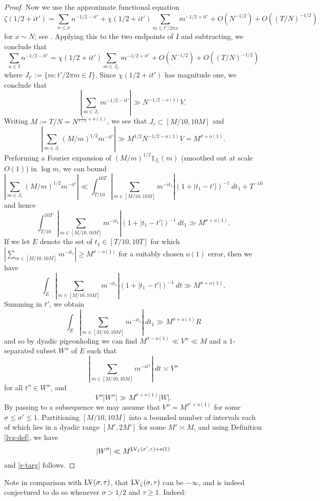 \begin{proof}
    Now we use the approximate functional equation
    $$ \zeta(1/2+it') = \sum_{n \leq x} n^{-1/2-it'} + \chi(1/2+it') \sum_{m \leq t' / 2\pi x} m^{-1/2+it'} + O(N^{-1/2}) + O((T/N)^{-1/2})$$
    for $x \sim N$; see \cite[Theorem 4.1]{ivic}.  Applying this to the two endpoints of $I$ and subtracting, we conclude that
    $$ \sum_{n \in I} n^{-1/2-it'} =\chi(1/2+it') \sum_{m \in J_{t'}} m^{-1/2+it'} + O(N^{-1/2}) + O((T/N)^{-1/2})$$
    where $J_{t'} := \{ m: t' / 2\pi m \in I \}$. Since $\chi(1/2+it')$ has magnitude one, we conclude that
    $$ |\sum_{m \in J_r} m^{-1/2-it'}| \gg N^{-1/2-o(1)} V.$$
    Writing $M := T/N = N^{\frac{1}{\tau-1}+o(1)}$, we see that $J_r \subset [M/10, 10M]$ and
    $$ |\sum_{m \in J_r} (M/m)^{1/2} m^{-it'}| \gg M^{1/2} N^{-1/2-o(1)} V = M^{\sigma+o(1)}.$$
    Performing a Fourier expansion of $(M/m)^{1/2} 1_{J_r}(m)$ (smoothed out at scale $O(1)$) in $\log m$, we can bound
    $$ |\sum_{m \in J_r} (M/m)^{1/2} m^{-it'}| \ll \int_{T/10}^{10T} |\sum_{m \in [M/10,10M]} m^{-it_1}| (1 + |t_1-t'|)^{-1}\ dt_1 + T^{-10}$$
    and hence
    $$ \int_{T/10}^{10T} |\sum_{m \in [M/10,10M]} m^{-it_1}| (1 + |t_1-t'|)^{-1}\ dt_1  \gg M^{\sigma+o(1)}.$$
    If we let $E$ denote the set of $t_1 \in [T/10, 10T]$ for which $|\sum_{m \in [M/10,10M]} m^{-it_1}| \geq M^{\sigma-o(1)}$ for a suitably chosen $o(1)$ error, then we have
    $$ \int_E |\sum_{m \in [M/10,10M]} m^{-it_1}| (1 + |t_1-t'|)^{-1}\ dt  \gg M^{\sigma+o(1)}.$$
    Summing in $t'$, we obtain
    $$ \int_E |\sum_{m \in [M/10,10M]} m^{-it_1}|\ dt_1  \gg M^{\sigma+o(1)} R$$
    and so by dyadic pigeonholing we can find $M^{\sigma-o(1)} \ll V'' \ll M$ and a $1$-separated subset $W''$ of $E$ such that
    $$ |\sum_{m \in [M/10,10M]} m^{-it''}|\ dt \asymp V''$$
    for all $t'' \in W''$, and
    $$ V'' |W''| \gg M^{\sigma+o(1)} |W|.$$
    By passing to a subsequence we may assume that $V'' = M^{\sigma'+o(1)}$ for some $\sigma \leq \sigma' \leq 1$. Partitioning $[M/10,10M]$ into a bounded number of intervals each of which lies in a dyadic range $[M',2M']$ for some $M' \asymp M$, and using Definition \ref{lvz-def}, we have
    $$ |W''|  \ll M^{\mathrm{LV}_\zeta(\sigma',\tau)+o(1)}$$
    and \eqref{r-targ} follows.
\end{proof}

Note in comparison with $\mathrm{LV}(\sigma,\tau)$, that $\mathrm{LV}_\zeta(\sigma,\tau)$ can be $-\infty$, and is indeed conjectured to do so whenever $\sigma>1/2$ and $\tau \geq 1$. Indeed:

